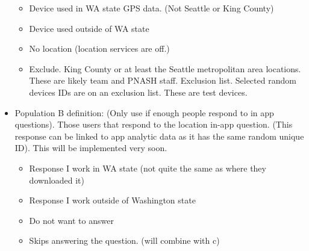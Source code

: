 \documentclass[
]{article}
\providecommand{\tightlist}{%
  \setlength{\itemsep}{0pt}\setlength{\parskip}{0pt}}
\begin{document}
\begin{itemize}
  \begin{itemize}
  \tightlist
  \item
    Device used in WA state GPS data. (Not Seattle or King County)
  \item
    Device used outside of WA state
  \item
    No location (location services are off.)
  \item
    Exclude. King County or at least the Seattle metropolitan area
    locations. These are likely team and PNASH staff. Exclusion list.
    Selected random devices IDs are on an exclusion list. These are test
    devices.
  \end{itemize}
\item
  Population B definition: (Only use if enough people respond to in app
  questions). Those users that respond to the location in-app question.
  (This response can be linked to app analytic data as it has the same
  random unique ID). This will be implemented very soon.

  \begin{itemize}
  \tightlist
  \item
    Response I work in WA state (not quite the same as where they
    downloaded it)
  \item
    Response I work outside of Washington state
  \item
    Do not want to answer
  \item
    Skips answering the question. (will combine with c)
  \end{itemize}
\end{itemize}
\end{document}
